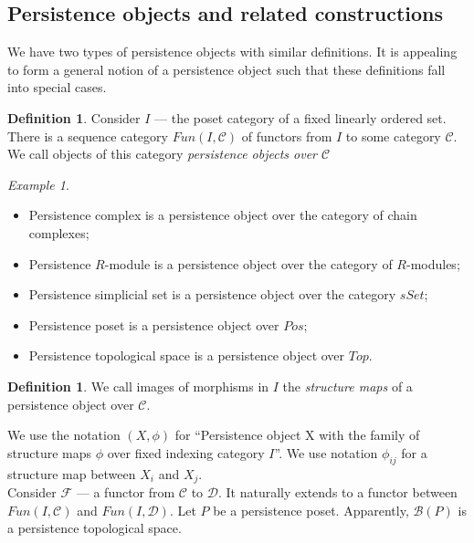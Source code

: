 \documentclass[english,12pt]{article}
\newcounter{stmcounter}[section]
\numberwithin{equation}{section}
\theoremstyle{definition}
\newtheorem{definition}[stmcounter]{Definition}
\theoremstyle{remark}
\newtheorem{example}[stmcounter]{Example}
\newcommand{\define}[1]{{\textit{#1}}}
\begin{document}
\subsection{Persistence objects and related constructions}

We have two types of persistence objects with similar definitions. It is appealing to form a general notion of a persistence object such that these definitions fall into special cases.\\

\begin{definition}
  Consider $I$ --- the poset category of a fixed linearly ordered set. There is a sequence category $Fun(I, \mathcal{C})$ of functors from $I$ to some category $\mathcal{C}$. We call objects of this category \define{persistence objects over $\mathcal{C}$}
\end{definition}

\begin{example} ~ \par
  \begin{itemize}
    \item Persistence complex is a persistence object over the category of chain complexes;
    \item Persistence $R$-module is a persistence object over the category of $R$-modules;
    \item Persistence simplicial set is a persistence object over the category $sSet$;
    \item Persistence poset is a persistence object over $Pos$;
    \item Persistence topological space is a persistence object over $Top$.
  \end{itemize}
\end{example}

\begin{definition}
  We call images of morphisms in $I$ the \define{structure maps} of a persistence object over $\mathcal{C}$.
\end{definition}

We use the notation $(X,\phi)$ for ``Persistence object X with the family of structure maps $\phi$ over fixed indexing category $I$''. We use notation $\phi_{ij}$ for a structure map between $X_i$ and $X_{j}$.\\

Consider $\mathcal{F}$ --- a functor from $\mathcal{C}$ to $\mathcal{D}$. It naturally extends to a functor between $Fun(I,\mathcal{C})$ and $Fun(I,\mathcal{D})$. Let $P$ be a persistence poset. Apparently, $\mathcal{B}(P)$ is a persistence topological space.\\
\end{document}
